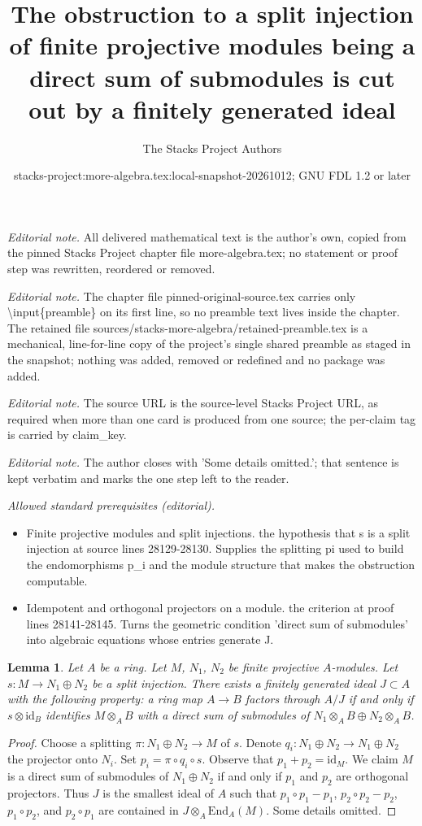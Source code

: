 \documentclass[10pt,a4paper]{amsart}
\title{The obstruction to a split injection of finite projective modules being a direct sum of submodules is cut out by a finitely generated ideal}
\author{The Stacks Project Authors}
\date{stacks-project:more-algebra.tex:local-snapshot-20261012; GNU FDL 1.2 or later}
\theoremstyle{plain}
\newtheorem{lemma}[subsection]{Lemma}
\theoremstyle{definition}
\theoremstyle{remark}
\numberwithin{equation}{subsection}
\begin{document}
\maketitle
\setcounter{subsection}{1}
\noindent\textit{Editorial note.} All delivered mathematical text is the author's own, copied from the pinned Stacks Project chapter file more-algebra.tex; no statement or proof step was rewritten, reordered or removed.\par\medskip
\noindent\textit{Editorial note.} The chapter file pinned-original-source.tex carries only \textbackslash{}input\{preamble\} on its first line, so no preamble text lives inside the chapter. The retained file sources/stacks-more-algebra/retained-preamble.tex is a mechanical, line-for-line copy of the project's single shared preamble as staged in the snapshot; nothing was added, removed or redefined and no package was added.\par\medskip
\noindent\textit{Editorial note.} The source URL is the source-level Stacks Project URL, as required when more than one card is produced from one source; the per-claim tag is carried by claim\_key.\par\medskip
\noindent\textit{Editorial note.} The author closes with 'Some details omitted.'; that sentence is kept verbatim and marks the one step left to the reader.\par\medskip
\noindent\textit{Allowed standard prerequisites (editorial).}\begin{itemize}
\item Finite projective modules and split injections. the hypothesis that s is a split injection at source lines 28129-28130. Supplies the splitting pi used to build the endomorphisms p\_i and the module structure that makes the obstruction computable.
\item Idempotent and orthogonal projectors on a module. the criterion at proof lines 28141-28145. Turns the geometric condition 'direct sum of submodules' into algebraic equations whose entries generate J.
\end{itemize}\medskip
\begin{lemma}
\label{lemma-ideal-direct-summand}
Let $A$ be a ring. Let $M$, $N_1$, $N_2$ be finite projective $A$-modules.
Let $s : M \to N_1 \oplus N_2$ be a split injection. There exists a
finitely generated ideal $J \subset A$ with the following property:
a ring map $A \to B$ factors through $A/J$ if and only if
$s \otimes \text{id}_B$
identifies $M \otimes_A B$ with a direct sum of submodules of
$N_1 \otimes_A B \oplus N_2 \otimes_A B$.
\end{lemma}

\begin{proof}
Choose a splitting $\pi : N_1 \oplus N_2 \to M$ of $s$. Denote
$q_i : N_1 \oplus N_2 \to N_1 \oplus N_2$ the projector onto $N_i$.
Set $p_i = \pi \circ q_i \circ s$. Observe that $p_1 + p_2 = \text{id}_M$.
We claim $M$ is a direct sum of submodules of $N_1 \oplus N_2$
if and only if $p_1$ and $p_2$ are orthogonal projectors.
Thus $J$ is the smallest ideal of $A$ such that
$p_1 \circ p_1 - p_1$, $p_2 \circ p_2 - p_2$, $p_1 \circ p_2$, and
$p_2 \circ p_1$ are contained in $J \otimes_A \text{End}_A(M)$.
Some details omitted.
\end{proof}
\end{document}
